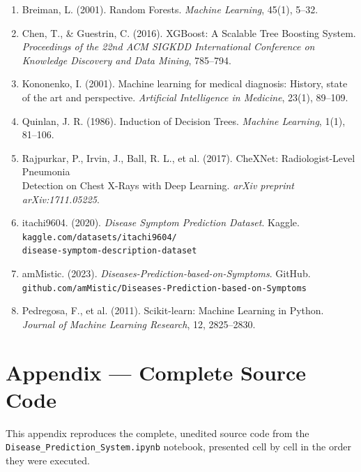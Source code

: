 \documentclass[12pt,a4paper]{article}
\begin{document}
\begin{enumerate}
    \item Breiman, L. (2001). Random Forests. \textit{Machine Learning}, 45(1), 5--32.
    \item Chen, T., \& Guestrin, C. (2016). XGBoost: A Scalable Tree Boosting System. \textit{Proceedings of the 22nd ACM SIGKDD International Conference on Knowledge Discovery and Data Mining}, 785--794.
    \item Kononenko, I. (2001). Machine learning for medical diagnosis: History, state of the art and perspective. \textit{Artificial Intelligence in Medicine}, 23(1), 89--109.
    \item Quinlan, J. R. (1986). Induction of Decision Trees. \textit{Machine Learning}, 1(1), 81--106.
    \item Rajpurkar, P., Irvin, J., Ball, R. L., et al. (2017). CheXNet: Radiologist-Level Pneumonia\\
          Detection on Chest X-Rays with Deep Learning. \textit{arXiv preprint arXiv:1711.05225}.
    \item itachi9604. (2020). \textit{Disease Symptom Prediction Dataset}. Kaggle.
          \newline\footnotesize\texttt{kaggle.com/datasets/itachi9604/}\\\hspace*{1em}\texttt{disease-symptom-description-dataset}\normalsize
    \item amMistic. (2023). \textit{Diseases-Prediction-based-on-Symptoms}. GitHub.
          \newline\footnotesize\texttt{github.com/amMistic/Diseases-Prediction-based-on-Symptoms}\normalsize
    \item Pedregosa, F., et al. (2011). Scikit-learn: Machine Learning in Python. \textit{Journal of Machine Learning Research}, 12, 2825--2830.
\end{enumerate}

\section{Appendix --- Complete Source Code}

This appendix reproduces the complete, unedited source code from the
\texttt{Disease\_Prediction\_System.ipynb} notebook, presented
cell by cell in the order they were executed.
\end{document}
